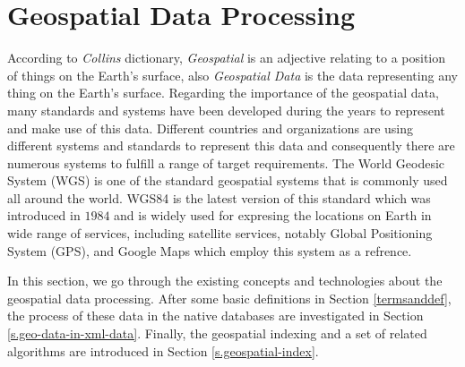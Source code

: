 \documentclass[a4paper,12pt]{article}
\begin{document}
\section{Geospatial Data Processing}
\label{s.method}
According to \emph{Collins} dictionary, \emph{Geospatial} is an adjective relating to a position of things on the Earth's surface, also \emph{Geospatial Data} is the data representing any thing on the Earth's surface. Regarding the importance of the geospatial data, many standards and systems have been developed  during the years to represent and make use of this data. Different countries and organizations are using different systems and standards to represent this data and consequently there are numerous systems to fulfill a range of target requirements. The World Geodesic System (WGS) is one of the standard geospatial systems that is commonly used all around the world. WGS84 is the latest version of this standard which
was introduced in $1984$ and is widely used for expresing the locations on Earth in wide range of services, including satellite services, notably Global Positioning System (GPS), and Google Maps which employ this system as a refrence.

In this section, we go through the existing concepts and technologies about the geospatial data processing. After some basic definitions in Section \ref{termsanddef}, the process of these data in the native databases are investigated in Section \ref{s.geo-data-in-xml-data}.
Finally, the geospatial indexing and a set of related algorithms are introduced in Section \ref{s.geospatial-index}.
\end{document}
